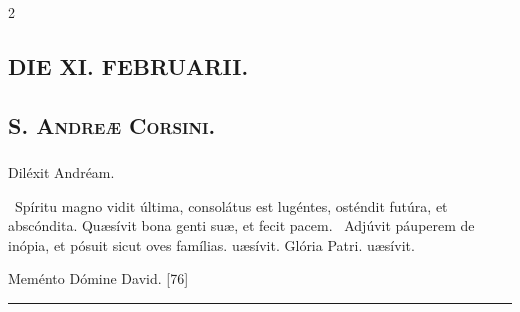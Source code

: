\documentclass[9pt,twoside]{extarticle}
\begin{document}
\begin{multicols}{2}
\subsection*{\center \textsc{DIE XI. FEBRUARII.}}
\subsubsection*{\center {}}
\subsection*{\center \textsc{S. Andreæ Corsini.}}
\subsubsection*{\center {}}

\begin{tightlist}{}
\item {} Diléxit Andréam.
\item {}
\item {}~Spíritu magno vidit última, consolátus est lugéntes, osténdit futúra, et abscóndita. \textred{*} Quæsívit bona genti suæ, et fecit pacem. ~Adjúvit páuperem de inópia, et pósuit sicut oves famílias. uæsívit. Glória Patri. uæsívit.
\item {}
\item {}
\item {} Meménto Dómine David. [76]
\end{tightlist}

\begin{center}\textcolor{red}{\rule{\linewidth}{0.5pt}} \end{center}


\end{multicols}
\end{document}
